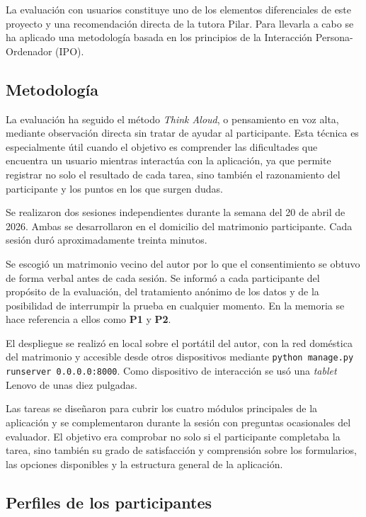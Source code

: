 La evaluación con usuarios constituye uno de los elementos diferenciales
de este proyecto y una recomendación directa de la tutora Pilar. Para llevarla a cabo se ha aplicado una metodología basada en
los principios de la Interacción Persona-Ordenador (IPO).

\subsection{Metodología\label{SUB:AIPO_METODOLOGIA}}

La evaluación ha seguido el método \emph{Think Aloud}, o pensamiento en
voz alta, mediante observación directa sin tratar de ayudar al participante. Esta técnica es especialmente útil cuando el objetivo es comprender las
dificultades que encuentra un usuario mientras interactúa con la
aplicación, ya que permite registrar no solo el resultado de cada tarea,
sino también el razonamiento del participante y los puntos en los que
surgen dudas.

Se realizaron dos sesiones independientes durante la semana del 20 de
abril de 2026. Ambas se desarrollaron en el domicilio del matrimonio
participante. Cada sesión duró
aproximadamente treinta minutos.

Se escogió un matrimonio vecino del autor por lo que el consentimiento se obtuvo de forma
verbal antes de cada sesión. Se informó a cada participante del propósito
de la evaluación, del tratamiento anónimo de los datos y de la posibilidad
de interrumpir la prueba en cualquier momento. En la memoria se hace
referencia a ellos como \textbf{P1} y \textbf{P2}.

El despliegue se realizó en local sobre el portátil del autor, con la red doméstica del matrimonio y accesible desde otros dispositivos
mediante \texttt{python manage.py runserver 0.0.0.0:8000}. Como dispositivo
de interacción se usó una \emph{tablet} Lenovo de unas diez pulgadas.

Las tareas se diseñaron para cubrir los cuatro módulos principales de la
aplicación y se
complementaron durante la sesión con preguntas ocasionales del
evaluador. El objetivo era comprobar no solo si el participante completaba
la tarea, sino también su grado de satisfacción y comprensión sobre los formularios, las
opciones disponibles y la estructura general de la aplicación.

\subsection{Perfiles de los
participantes\label{SUB:AIPO_PERFILES}}

